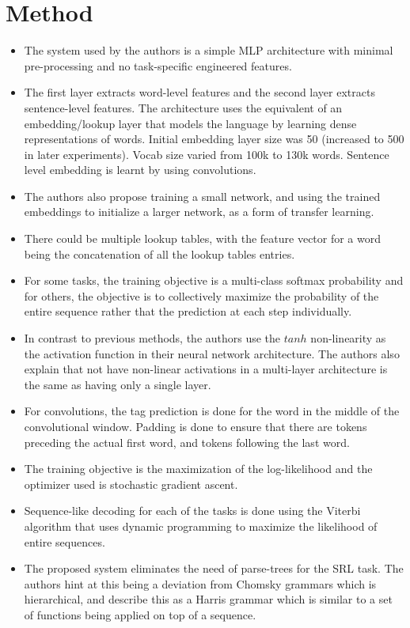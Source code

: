 \documentclass[12pt]{article}
\begin{document}
\section{Method}
  \begin{itemize}
    \item The system used by the authors is a simple MLP architecture with minimal pre-processing and no task-specific engineered features.
    \item The first layer extracts word-level features and the second layer extracts sentence-level features. The architecture uses the equivalent of an embedding/lookup layer that models the language by learning dense representations of words. Initial embedding layer size was 50 (increased to 500 in later experiments). Vocab size varied from 100k to 130k words. Sentence level embedding is learnt by using convolutions.
    \item The authors also propose training a small network, and using the trained embeddings to initialize a larger network, as a form of transfer learning.
    \item There could be multiple lookup tables, with the feature vector for a word being the concatenation of all the lookup tables entries.
    \item For some tasks, the training objective is a multi-class softmax probability and for others, the objective is to collectively maximize the probability of the entire sequence rather that the prediction at each step individually.
    \item In contrast to previous methods, the authors use the $tanh$ non-linearity as the activation function in their neural network architecture. The authors also explain that not have non-linear activations in a multi-layer architecture is the same as having only a single layer.
    \item For convolutions, the tag prediction is done for the word in the middle of the convolutional window. Padding is done to ensure that there are tokens preceding the actual first word, and tokens following the last word.
    \item The training objective is the maximization of the log-likelihood and the optimizer used is stochastic gradient ascent.
    \item Sequence-like decoding for each of the tasks is done using the Viterbi algorithm that uses dynamic programming to maximize the likelihood of entire sequences.
    \item The proposed system eliminates the need of parse-trees for the SRL task. The authors hint at this being a deviation from Chomsky grammars which is hierarchical, and describe this as a Harris grammar which is similar to a set of functions being applied on top of a sequence.

\end{itemize}
\end{document}
